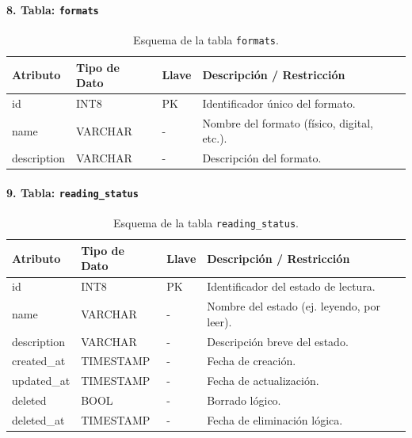 \documentclass[12pt, atypical, journal]{article}
\begin{document}
\paragraph{8. Tabla: \texttt{formats}}
\begin{table}[H]
	\centering
	\begin{tabular}{|l|l|l|p{6.5cm}|}
		\hline
		\textbf{Atributo} & \textbf{Tipo de Dato} & \textbf{Llave} & \textbf{Descripción / Restricción} \\ \hline
		id & INT8 & PK & Identificador único del formato. \\ \hline
		name & VARCHAR & - & Nombre del formato (físico, digital, etc.). \\ \hline
		description & VARCHAR & - & Descripción del formato. \\ \hline
	\end{tabular}
	\caption{Esquema de la tabla \texttt{formats}.}
\end{table}

\paragraph{9. Tabla: \texttt{reading\_status}}
\begin{table}[H]
	\centering
	\begin{tabular}{|l|l|l|p{6.5cm}|}
		\hline
		\textbf{Atributo} & \textbf{Tipo de Dato} & \textbf{Llave} & \textbf{Descripción / Restricción} \\ \hline
		id & INT8 & PK & Identificador del estado de lectura. \\ \hline
		name & VARCHAR & - & Nombre del estado (ej. leyendo, por leer). \\ \hline
		description & VARCHAR & - & Descripción breve del estado. \\ \hline
		created\_at & TIMESTAMP & - & Fecha de creación. \\ \hline
		updated\_at & TIMESTAMP & - & Fecha de actualización. \\ \hline
		deleted & BOOL & - & Borrado lógico. \\ \hline
		deleted\_at & TIMESTAMP & - & Fecha de eliminación lógica. \\ \hline
	\end{tabular}
	\caption{Esquema de la tabla \texttt{reading\_status}.}
\end{table}
\end{document}
